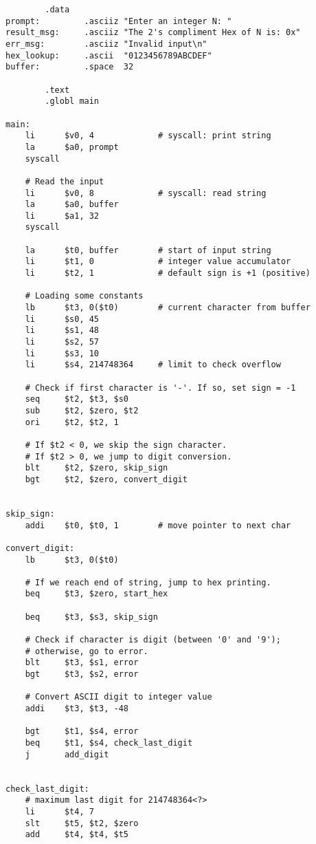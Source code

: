 \documentclass[a4paper]{article}
\begin{document}
\begin{verbatim}
        .data
prompt:         .asciiz "Enter an integer N: "
result_msg:     .asciiz "The 2's compliment Hex of N is: 0x"
err_msg:        .asciiz "Invalid input\n"
hex_lookup:     .ascii  "0123456789ABCDEF"
buffer:         .space  32

        .text
        .globl main

main:
    li      $v0, 4             # syscall: print string
    la      $a0, prompt
    syscall

    # Read the input
    li      $v0, 8             # syscall: read string
    la      $a0, buffer
    li      $a1, 32
    syscall

    la      $t0, buffer        # start of input string
    li      $t1, 0             # integer value accumulator
    li      $t2, 1             # default sign is +1 (positive)

    # Loading some constants
    lb      $t3, 0($t0)        # current character from buffer
    li      $s0, 45
    li      $s1, 48            
    li      $s2, 57            
    li      $s3, 10
    li      $s4, 214748364     # limit to check overflow

    # Check if first character is '-'. If so, set sign = -1
    seq     $t2, $t3, $s0
    sub     $t2, $zero, $t2
    ori     $t2, $t2, 1

    # If $t2 < 0, we skip the sign character.
    # If $t2 > 0, we jump to digit conversion.
    blt     $t2, $zero, skip_sign
    bgt     $t2, $zero, convert_digit


skip_sign:
    addi    $t0, $t0, 1        # move pointer to next char

convert_digit:
    lb      $t3, 0($t0)

    # If we reach end of string, jump to hex printing.
    beq     $t3, $zero, start_hex

    beq     $t3, $s3, skip_sign

    # Check if character is digit (between '0' and '9');
    # otherwise, go to error.
    blt     $t3, $s1, error
    bgt     $t3, $s2, error

    # Convert ASCII digit to integer value
    addi    $t3, $t3, -48

    bgt     $t1, $s4, error
    beq     $t1, $s4, check_last_digit
    j       add_digit


check_last_digit:
    # maximum last digit for 214748364<?>
    li      $t4, 7
    slt     $t5, $t2, $zero
    add     $t4, $t4, $t5


\end{verbatim}
\end{document}
